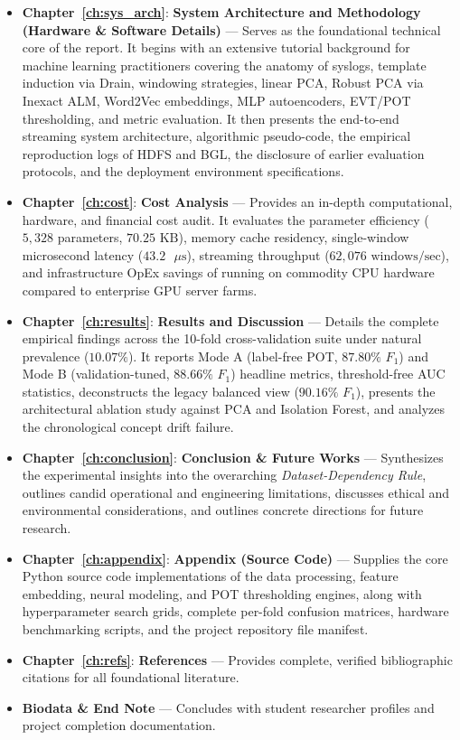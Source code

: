 \begin{itemize}
    \item \textbf{Chapter~\ref{ch:sys_arch}}: \textbf{System Architecture and Methodology (Hardware \& Software Details)} --- Serves as the foundational technical core of the report. It begins with an extensive tutorial background for machine learning practitioners covering the anatomy of syslogs, template induction via Drain, windowing strategies, linear PCA, Robust PCA via Inexact ALM, Word2Vec embeddings, MLP autoencoders, EVT/POT thresholding, and metric evaluation. It then presents the end-to-end streaming system architecture, algorithmic pseudo-code, the empirical reproduction logs of HDFS and BGL, the disclosure of earlier evaluation protocols, and the deployment environment specifications.
    \item \textbf{Chapter~\ref{ch:cost}}: \textbf{Cost Analysis} --- Provides an in-depth computational, hardware, and financial cost audit. It evaluates the parameter efficiency ($5,328$ parameters, $70.25\text{ KB}$), memory cache residency, single-window microsecond latency ($43.2\text{ }\mu\text{s}$), streaming throughput ($62,076\text{ windows/sec}$), and infrastructure OpEx savings of running on commodity CPU hardware compared to enterprise GPU server farms.
    \item \textbf{Chapter~\ref{ch:results}}: \textbf{Results and Discussion} --- Details the complete empirical findings across the 10-fold cross-validation suite under natural prevalence ($10.07\%$). It reports Mode A (label-free POT, $87.80\%$ $F_1$) and Mode B (validation-tuned, $88.66\%$ $F_1$) headline metrics, threshold-free AUC statistics, deconstructs the legacy balanced view ($90.16\%$ $F_1$), presents the architectural ablation study against PCA and Isolation Forest, and analyzes the chronological concept drift failure.
    \item \textbf{Chapter~\ref{ch:conclusion}}: \textbf{Conclusion \& Future Works} --- Synthesizes the experimental insights into the overarching \textit{Dataset-Dependency Rule}, outlines candid operational and engineering limitations, discusses ethical and environmental considerations, and outlines concrete directions for future research.
    \item \textbf{Chapter~\ref{ch:appendix}}: \textbf{Appendix (Source Code)} --- Supplies the core Python source code implementations of the data processing, feature embedding, neural modeling, and POT thresholding engines, along with hyperparameter search grids, complete per-fold confusion matrices, hardware benchmarking scripts, and the project repository file manifest.
    \item \textbf{Chapter~\ref{ch:refs}}: \textbf{References} --- Provides complete, verified bibliographic citations for all foundational literature.
    \item \textbf{Biodata \& End Note} --- Concludes with student researcher profiles and project completion documentation.
\end{itemize}

